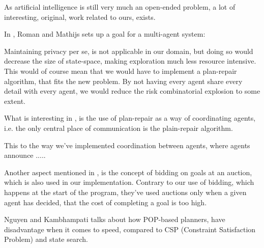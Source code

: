 \documentclass[Main]{subfiles}
\begin{document}
As artificial intelligence is still very much an open-ended problem, a lot of interesting, original, work related to ours, exists.

In \citep{VanderKrogt2005}, Roman and Mathijs sets up a goal for a multi-agent system:

Maintaining privacy per se, is not applicable in our domain, but doing so would decrease the size of state-space, 
making exploration much less resource intensive. 
This would of course mean that we would have to implement a plan-repair algorithm, that fits the new problem.
By not having every agent share every detail with every agent, we would reduce the risk combinatorial explosion to some extent.

What is interesting in \citep{VanderKrogt2005}, is the use of plan-repair as a way of coordinating agents, i.e. the only central place of communication is the plain-repair algorithm.

This  to the way we've implemented coordination between agents, where agents announce ..... 

Another aspect mentioned in \citep{VanderKrogt2005}, is the concept of bidding on goals at an auction, which is also used in our implementation.
Contrary to our use of bidding, which happens at the start of the program, they've used auctions only when a given agent has decided, that the cost of completing a goal is too high.

Nguyen and Kambhampati \citep{Nguyen2001} talks about how POP-based planners, have disadvantage when it comes to speed, compared to CSP (Constraint Satisfaction Problem) and state search.
\end{document}
